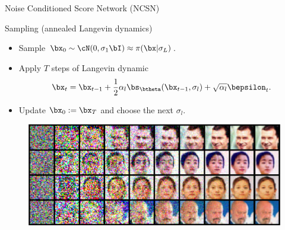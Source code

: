 \begin{frame}{Noise Conditioned Score Network (NCSN)}
	\begin{block}{Sampling (annealed Langevin dynamics)}
		\begin{itemize}
			\item Sample $\bx_0 \sim \cN(0, \sigma_1 \bI) \approx \pi(\bx | \sigma_L)$.
			\item Apply $T$ steps of Langevin dynamic
			\vspace{-0.2cm}
			\[
				\bx_t = \bx_{t-1} + \frac{1}{2}\alpha_l \bs_{\btheta}(\bx_{t - 1}, \sigma_l) + \sqrt{\alpha_l} \bepsilon_t.
			\] 
			\vspace{-0.5cm}
			\item Update $\bx_0 := \bx_T$ and choose the next $\sigma_l$.
		\end{itemize}
	\end{block}
	\begin{figure}
		\includegraphics[width=0.9\linewidth]{figs/ald}
	\end{figure}
\end{frame}

